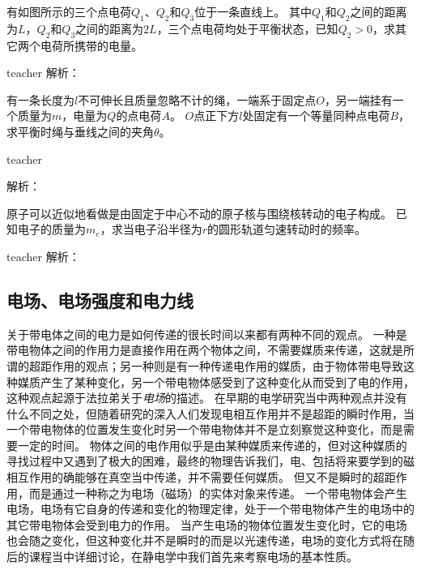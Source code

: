 \begin{example}
有如图所示的三个点电荷$Q_1$、$Q_2$和$Q_3$位于一条直线上。
其中$Q_1$和$Q_2$之间的距离为$L$，$Q_2$和$Q_3$之间的距离为$2L$，三个点电荷均处于平衡状态，已知$Q_2>0$，求其它两个电荷所携带的电量。
\begin{taggedblock}{teacher}
\newline
解析：
\end{taggedblock}
\end{example}

\begin{example}
有一条长度为$l$不可伸长且质量忽略不计的绳，一端系于固定点$O$，另一端挂有一个质量为$m$，电量为$Q$的点电荷$A$。
$O$点正下方$l$处固定有一个等量同种点电荷$B$，求平衡时绳与垂线之间的夹角$\theta$。
\begin{taggedblock}{teacher}

解析：
\end{taggedblock}
\end{example}

\begin{example}
原子可以近似地看做是由固定于中心不动的原子核与围绕核转动的电子构成。
已知电子的质量为$m_e$，求当电子沿半径为$r$的圆形轨道匀速转动时的频率。
\begin{taggedblock}{teacher}
\newline
解析：
\end{taggedblock}
\end{example}



\subsection{电场、电场强度和电力线}
关于带电体之间的电力是如何传递的很长时间以来都有两种不同的观点。
一种是带电物体之间的作用力是直接作用在两个物体之间，不需要媒质来传递，这就是所谓的超距作用的观点；另一种则是有一种传递电作用的媒质，由于物体带电导致这种媒质产生了某种变化，另一个带电物体感受到了这种变化从而受到了电的作用，这种观点起源于法拉弟关于\emph{电场}的描述。
在早期的电学研究当中两种观点并没有什么不同之处，但随着研究的深入人们发现电相互作用并不是超距的瞬时作用，当一个带电物体的位置发生变化时另一个带电物体并不是立刻察觉这种变化，而是需要一定的时间。
物体之间的电作用似乎是由某种媒质来传递的，但对这种媒质的寻找过程中又遇到了极大的困难，最终的物理告诉我们，电、包括将来要学到的磁相互作用的确能够在真空当中传递，并不需要任何媒质。
但又不是瞬时的超距作用，而是通过一种称之为电场（磁场）的实体对象来传递。
一个带电物体会产生电场，电场有它自身的传递和变化的物理定律，处于一个带电物体产生的电场中的其它带电物体会受到电力的作用。
当产生电场的物体位置发生变化时，它的电场也会随之变化，但这种变化并不是瞬时的而是以光速传递，电场的变化方式将在随后的课程当中详细讨论，在静电学中我们首先来考察电场的基本性质。

